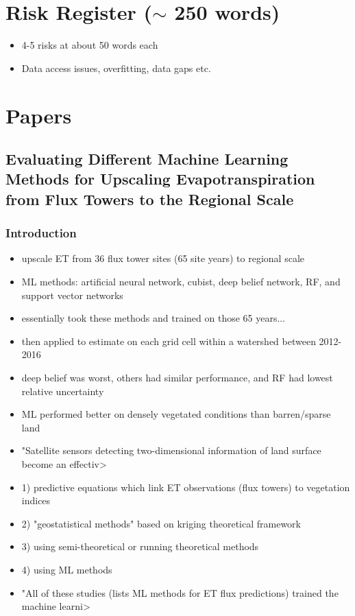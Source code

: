 \documentclass[paper=a4, fontsize=12pt]{scrartcl}
\begin{document}
	\newpage
	\section{Risk Register ($\sim$ 250 words)}
	\begin{itemize}
		\item 4-5 risks at about 50 words each
		\item Data access issues, overfitting, data gaps etc.
	\end{itemize}
	
	\newpage
	\section{Papers}
	\subsection{Evaluating Different Machine Learning Methods for Upscaling Evapotranspiration from Flux Towers to the Regional Scale \citep{xu2018evaluating}
	}
	\subsubsection{Introduction}
	\begin{itemize}
		\item upscale ET from 36 flux tower sites (65 site years) to regional scale
		\item ML methods: artificial neural network, cubist, deep belief network, RF, and support vector networks
		\item essentially took these methods and trained on those 65 years...
		\item then applied to estimate on each grid cell within a watershed between 2012-2016  
		\item deep belief was worst, others had similar performance, and RF had lowest relative uncertainty
		\item ML performed better on densely vegetated conditions than barren/sparse land
		\item "Satellite sensors detecting two-dimensional information of land surface become an effectiv>
		\item 1) predictive equations which link ET observations (flux towers) to vegetation indices 
		\item 2) "geostatistical methods" based on kriging theoretical framework  
		\item 3) using semi-theoretical or running theoretical methods  
		\item 4) using ML methods  
		\item "All of these studies (lists ML methods for ET flux predictions) trained the machine learni>
	\end{itemize}
	
\end{document}
